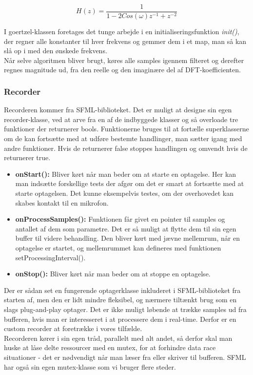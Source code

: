 \begin{equation}\label{eq:transferfunction}
H(z) = \frac{1}{1-2Cos(\omega)z^{-1}+z^{-2}}
\end{equation}


I goertzel-klassen foretages det tunge arbejde i en initialiseringsfunktion \textit{init()}, der regner alle konstanter til hver frekvens og gemmer dem i et map, man så kan slå op i med den ønskede frekvens. \\
Når selve algoritmen bliver brugt, køres alle samples igennem filteret og derefter regnes magnitude ud, fra den reelle og den imaginære del af DFT-koefficienten.





\subsubsection{Recorder}

Recorderen kommer fra SFML-biblioteket. Det er muligt at designe sin egen recorder-klasse, ved at arve fra en af de indbyggede klasser og så overloade tre funktioner der returnerer bools. Funktionerne bruges til at fortælle superklasserne om de kan fortsætte med at udføre bestemte handlinger, man sætter igang med andre funktioner. Hvis de returnerer false stoppes handlingen og omvendt hvis de returnerer true.

\begin{itemize}

\item \textbf{onStart():} Bliver kørt når man beder om at starte en optagelse. Her kan man indsætte forskellige tests der afgør om det er smart at fortsætte med at starte optagelsen. Det kunne eksempelvis testes, om der overhovedet kan skabes kontakt til en mikrofon.

\item \textbf{onProcessSamples():} Funktionen får givet en pointer til samples og antallet af dem som parametre. Det er så muligt at flytte dem til sin egen buffer til videre behandling. Den bliver kørt med jævne mellemrum, når en optagelse er startet, og mellemrummet kan defineres med funktionen setProcessingInterval(). 

\item \textbf{onStop():} Bliver kørt når man beder om at stoppe en optagelse.

\end{itemize}

Der er sådan set en fungerende optagerklasse inkluderet i SFML-biblioteket fra starten af, men den er lidt mindre fleksibel, og nærmere tiltænkt brug som en slags plug-and-play optager. Det er ikke muligt løbende at trække samples ud fra bufferen, hvis man er interesseret i at processere dem i real-time. Derfor er en custom recorder at foretrække i vores tilfælde. \\
Recorderen kører i sin egen tråd, parallelt med alt andet, så derfor skal man huske at låse delte ressourcer med en mutex, for at forhindre data race situationer - det er nødvendigt når man læser fra eller skriver til bufferen. SFML har også sin egen mutex-klasse som vi bruger flere steder.

